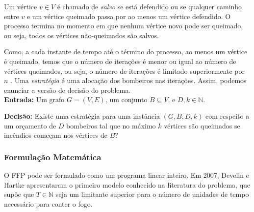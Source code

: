 \documentclass{MO824}
\newcommand{\N}{\mathbb{N}}
\begin{document}
    Um vértice $v \in V$ é chamado de \textit{salvo} se está defendido ou se qualquer caminho entre $v$ e um vértice queimado passa por ao menos um vértice defendido. O processo termina no momento em que nenhum vértice novo pode ser queimado, ou seja, todos os vértices não-queimados são salvos. 
    
    Como, a cada instante de tempo até o término do processo, ao menos um vértice é queimado, temos que o número de iterações é menor ou igual ao número de vértices queimados, ou seja, o número de iterações é limitado superiormente por $n$ \cite{structural}. Uma \textit{estratégia} é uma alocação dos bombeiros nas iterações. Assim, podemos enunciar a versão de decisão do problema.\\
    
    \textbf{Entrada:} Um grafo $G=(V,E)$, um conjunto $B \subseteq V$, e $D,k \in \N$.
    \par\textbf{Decisão:} Existe uma estratégia para uma instância $(G,B,D,k)$ com respeito a um orçamento de $D$ bombeiros tal que no máximo $k$ vértices são queimados se incêndios começam nos vértices de $B$?
    
    \subsubsection{Formulação Matemática} \label{model}
    
    O FFP pode ser formulado como um programa linear inteiro. Em 2007, Develin e Hartke \cite{ilp} apresentaram o primeiro modelo conhecido na literatura do problema, que supõe que $T \in \N$ seja um limitante superior para o número de unidades de tempo necessário para conter o fogo. 
    
\end{document}
